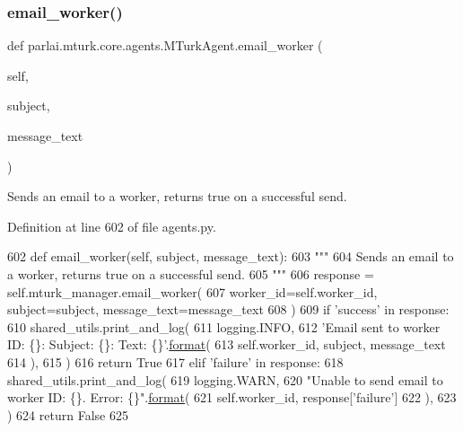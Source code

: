 \subsubsection{\texorpdfstring{email\+\_\+worker()}{email\_worker()}}
{\footnotesize\ttfamily def parlai.\+mturk.\+core.\+agents.\+M\+Turk\+Agent.\+email\+\_\+worker (\begin{DoxyParamCaption}\item[{}]{self,  }\item[{}]{subject,  }\item[{}]{message\+\_\+text }\end{DoxyParamCaption})}

\begin{DoxyVerb}Sends an email to a worker, returns true on a successful send.
\end{DoxyVerb}
 

Definition at line 602 of file agents.\+py.


\begin{DoxyCode}
602     \textcolor{keyword}{def }email\_worker(self, subject, message\_text):
603         \textcolor{stringliteral}{"""}
604 \textcolor{stringliteral}{        Sends an email to a worker, returns true on a successful send.}
605 \textcolor{stringliteral}{        """}
606         response = self.mturk\_manager.email\_worker(
607             worker\_id=self.worker\_id, subject=subject, message\_text=message\_text
608         )
609         \textcolor{keywordflow}{if} \textcolor{stringliteral}{'success'} \textcolor{keywordflow}{in} response:
610             shared\_utils.print\_and\_log(
611                 logging.INFO,
612                 \textcolor{stringliteral}{'Email sent to worker ID: \{\}: Subject: \{\}: Text: \{\}'}.\hyperlink{namespaceparlai_1_1chat__service_1_1services_1_1messenger_1_1shared__utils_a32e2e2022b824fbaf80c747160b52a76}{format}(
613                     self.worker\_id, subject, message\_text
614                 ),
615             )
616             \textcolor{keywordflow}{return} \textcolor{keyword}{True}
617         \textcolor{keywordflow}{elif} \textcolor{stringliteral}{'failure'} \textcolor{keywordflow}{in} response:
618             shared\_utils.print\_and\_log(
619                 logging.WARN,
620                 \textcolor{stringliteral}{"Unable to send email to worker ID: \{\}. Error: \{\}"}.\hyperlink{namespaceparlai_1_1chat__service_1_1services_1_1messenger_1_1shared__utils_a32e2e2022b824fbaf80c747160b52a76}{format}(
621                     self.worker\_id, response[\textcolor{stringliteral}{'failure'}]
622                 ),
623             )
624             \textcolor{keywordflow}{return} \textcolor{keyword}{False}
625 
\end{DoxyCode}
\mbox{\label{classparlai_1_1mturk_1_1core_1_1agents_1_1MTurkAgent_a9ab8c622bfe7d697d7cba94dc7c4b5a3}} 
